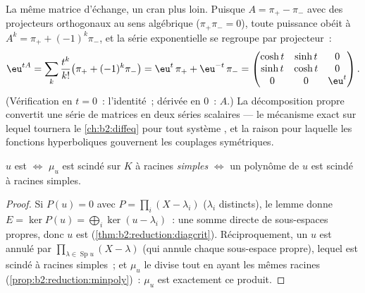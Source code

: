 \begin{example}\label{ex:b2:reduction:expprojectors}
La même matrice d'échange, un cran plus loin. Puisque $A = \pi_+ -
\pi_-$ avec des projecteurs orthogonaux au sens algébrique
($\pi_+\pi_- = 0$), toute puissance obéit à $A^k = \pi_+ +
(-1)^k\pi_-$, et la série exponentielle se regroupe par projecteur~:
\[
\eu^{tA} = \sum_k \frac{t^k}{k!}\bigl(\pi_+ +
(-1)^k\pi_-\bigr)
= \eu^{t}\,\pi_+ + \eu^{-t}\,\pi_- =
\begin{pmatrix}
\cosh t & \sinh t & 0\\
\sinh t & \cosh t & 0\\
0 & 0 & \eu^{t}
\end{pmatrix}.
\]
(Vérification en $t = 0$~: l'identité~; dérivée en $0$~: $A$.) La
décomposition propre convertit une série de matrices en deux séries
scalaires --- le mécanisme exact sur lequel tournera le
\cref{ch:b2:diffeq} pour tout système , et la raison
pour laquelle les fonctions hyperboliques gouvernent les couplages
symétriques.
\end{example}

\begin{corollary}\label{cor:b2:reduction:minpolycrit}
$u$ est  $\iff$ $\mu_u$ est scindé sur $K$ à racines
\emph{simples} $\iff$ un polynôme  de $u$ est scindé à
racines simples.
\end{corollary}

\begin{proof}
Si $P(u) = 0$ avec $P = \prod_{i}(X - \lambda_i)$ ($\lambda_i$
distincts), le lemme donne $E = \ker P(u) = \bigoplus_i \ker(u -
\lambda_i)$~: une somme directe de sous-espaces propres, donc $u$ est
 (\cref{thm:b2:reduction:diagcrit}). Réciproquement, un
$u$  est annulé par $\prod_{\lambda \in
\operatorname{Sp}u}(X - \lambda)$ (qui annule chaque sous-espace
propre), lequel est scindé à racines simples~; et $\mu_u$ le divise
tout en ayant les mêmes racines (\cref{prop:b2:reduction:minpoly})~:
$\mu_u$ est exactement ce produit.
\end{proof}

